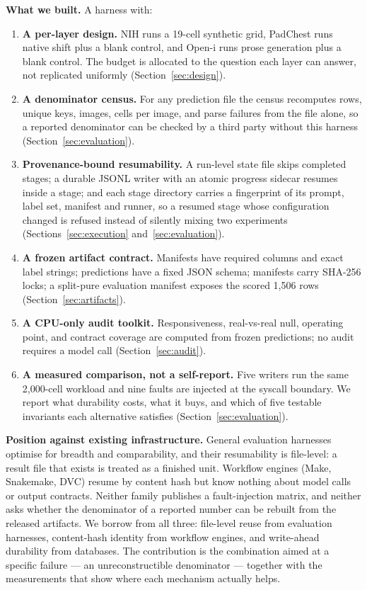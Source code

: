 \textbf{What we built.} A harness with:
\begin{enumerate}[leftmargin=1.2em,itemsep=2pt,topsep=2pt]
\item \textbf{A per-layer design.} NIH runs a 19-cell synthetic grid, PadChest runs native shift plus a blank control, and Open-i runs prose generation plus a blank control. The budget is allocated to the question each layer can answer, not replicated uniformly (Section~\ref{sec:design}).
\item \textbf{A denominator census.} For any prediction file the census recomputes rows, unique keys, images, cells per image, and parse failures from the file alone, so a reported denominator can be checked by a third party without this harness (Section~\ref{sec:evaluation}).
\item \textbf{Provenance-bound resumability.} A run-level state file skips completed stages; a durable JSONL writer with an atomic progress sidecar resumes inside a stage; and each stage directory carries a fingerprint of its prompt, label set, manifest and runner, so a resumed stage whose configuration changed is refused instead of silently mixing two experiments (Sections~\ref{sec:execution} and~\ref{sec:evaluation}).
\item \textbf{A frozen artifact contract.} Manifests have required columns and exact label strings; predictions have a fixed JSON schema; manifests carry SHA-256 locks; a split-pure evaluation manifest exposes the scored 1,506 rows (Section~\ref{sec:artifacts}).
\item \textbf{A CPU-only audit toolkit.} Responsiveness, real-vs-real null, operating point, and contract coverage are computed from frozen predictions; no audit requires a model call (Section~\ref{sec:audit}).
\item \textbf{A measured comparison, not a self-report.} Five writers run the same 2,000-cell workload and nine faults are injected at the syscall boundary. We report what durability costs, what it buys, and which of five testable invariants each alternative satisfies (Section~\ref{sec:evaluation}).
\end{enumerate}

\textbf{Position against existing infrastructure.} General evaluation harnesses optimise for breadth and comparability, and their resumability is file-level: a result file that exists is treated as a finished unit. Workflow engines (Make, Snakemake, DVC) resume by content hash but know nothing about model calls or output contracts. Neither family publishes a fault-injection matrix, and neither asks whether the denominator of a reported number can be rebuilt from the released artifacts. We borrow from all three: file-level reuse from evaluation harnesses, content-hash identity from workflow engines, and write-ahead durability from databases. The contribution is the combination aimed at a specific failure --- an unreconstructible denominator --- together with the measurements that show where each mechanism actually helps.

